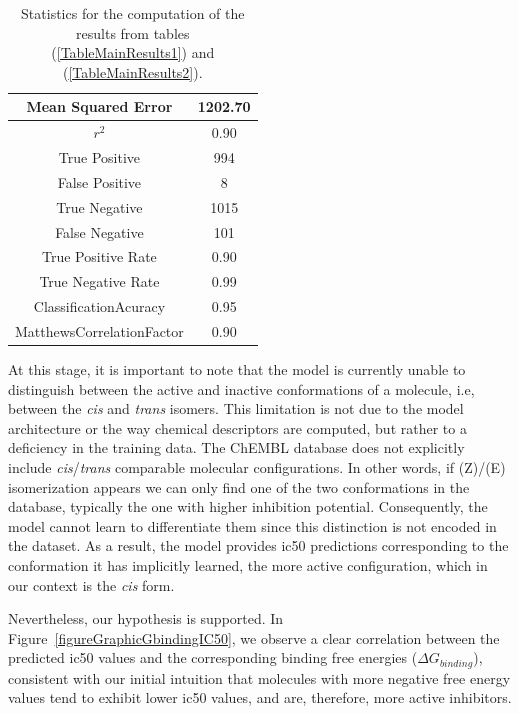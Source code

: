 \documentclass[11pt]{article}
\begin{document}
\begin{table}[H]
    \centering	
	\caption{Statistics for the computation of the results from tables (\ref{TableMainResults1}) and (\ref{TableMainResults2}).}
	\label{TableStatisitcsMainResults}
	\begin{tabular}{c|c}
		Mean Squared Error       & 1202.70\\\hline
		$r^2$ 	                 & 0.90\\\hline
		True Positive            & 994\\\hline
		False Positive           & 8\\\hline
		True Negative            & 1015\\\hline
		False Negative           & 101\\\hline
		True Positive Rate       & 0.90\\\hline
		True Negative Rate       & 0.99\\\hline
		ClassificationAcuracy    & 0.95\\\hline
		MatthewsCorrelationFactor& 0.90
    \end{tabular}
\end{table}
At this stage, it is important to note that the model is currently unable to distinguish between the active and inactive conformations of a molecule, i.e, between the \emph{cis} and \emph{trans} isomers. This limitation is not due to the model architecture or the way chemical descriptors are computed, but rather to a deficiency in the training data. The ChEMBL database \cite{ChemblDatabase} does not explicitly include \emph{cis}/\emph{trans} comparable molecular configurations. In other words, if (Z)/(E) isomerization appears we can only find one of the two conformations in the database, typically the one with higher inhibition potential. Consequently, the model cannot learn to differentiate them since this distinction is not encoded in the dataset. As a result, the model provides \gls{ic50} predictions corresponding to the conformation it has implicitly learned, the more active configuration, which in our context is the \emph{cis} form.


Nevertheless, our hypothesis is supported. In Figure~\ref{figureGraphicGbindingIC50}, we observe a clear correlation between the predicted \gls{ic50} values and the corresponding binding free energies ($\Delta G_{binding}$), consistent with our initial intuition that molecules with more negative free energy values tend to exhibit lower \gls{ic50} values, and are, therefore, more active inhibitors.
\end{document}

